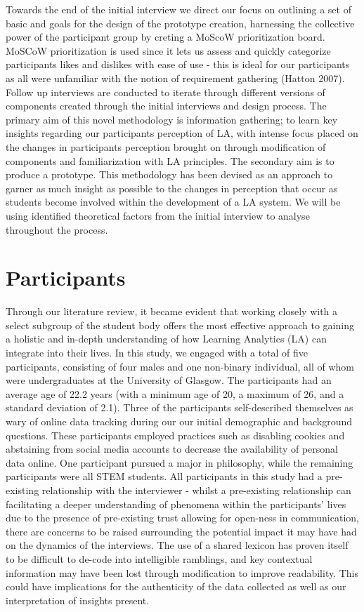 \documentclass{l4proj}
\begin{document}
Towards the end of the initial interview we direct our focus on outlining a set of basic and goals for the design of the prototype creation, harnessing the collective power of the participant group by creting a MoScoW prioritization board. MoSCoW prioritization is used since it lets us assess and quickly categorize participants likes and dislikes with ease of use - this is ideal for our participants as all were unfamiliar with the notion of requirement gathering (Hatton 2007). Follow up interviews are conducted to iterate through different versions of components created through the initial interviews and design process. The primary aim of this novel methodology is information gathering; to learn key insights regarding our participants perception of LA, with intense focus placed on the changes in participants perception brought on through modification of components and familiarization with LA principles. The secondary aim is to produce a prototype. This methodology has been devised as an approach to garner as much insight as possible to the changes in perception that occur as students become involved within the development of a LA system. We will be using identified theoretical factors from the initial interview to analyse throughout the process.

\section{Participants}
Through our literature review, it became evident that working closely with a select subgroup of the student body offers the most effective approach to gaining a holistic and in-depth understanding of how Learning Analytics (LA) can integrate into their lives. In this study, we engaged with a total of five participants, consisting of four males and one non-binary individual, all of whom were undergraduates at the University of Glasgow. The participants had an average age of 22.2 years (with a minimum age of 20, a maximum of 26, and a standard deviation of 2.1). Three of the participants self-described themselves as wary of online data tracking during our our initial demographic and background questions. These participants employed practices such as disabling cookies and abstaining from social media accounts to decrease the availability of personal data online. One participant pursued a major in philosophy, while the remaining participants were all STEM students. All participants in this study had a pre-existing relationship with the interviewer - whilst a pre-existing relationship can facilitating a deeper understanding of phenomena within the participants' lives due to the presence of pre-existing trust allowing for open-ness in communication, there are concerns to be raised surrounding the potential impact it may have had on the dynamics of the interviews. The use of a shared lexicon has proven itself to be difficult to de-code into intelligible ramblings, and key contextual information may have been lost through modification to improve readability. This could have implications for the authenticity of the data collected as well as our interpretation of insights present. 
\end{document}
